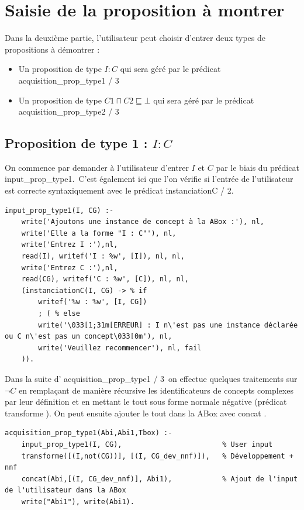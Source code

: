 \documentclass{article}
\begin{document}
\section{Saisie de la proposition à montrer}
Dans la deuxième partie, l'utilisateur peut choisir d'entrer deux types de propositions à démontrer : 
\begin{itemize}
    \item Un proposition de type $ I : C $ qui sera géré par le prédicat \color{blue}acquisition\_prop\_type1 / 3 \color{black}
    \item Un proposition de type $ C1 \sqcap C2 \sqsubseteq \bot  $ qui sera géré par le prédicat \color{blue}acquisition\_prop\_type2 / 3 \color{black}
\end{itemize}

\subsection{Proposition de type 1 : $ I : C $ }
On commence par demander à l'utilisateur d'entrer $ I $ et $ C $ par le biais du prédicat \color{blue}input\_prop\_type1\color{black}.\ C'est également ici que l'on vérifie si l'entrée de l'utilisateur est correcte syntaxiquement avec le prédicat \color{blue}instanciationC / 2\color{black}.
\begin{verbatim}
input_prop_type1(I, CG) :-
    write('Ajoutons une instance de concept à la ABox :'), nl,
    write('Elle a la forme "I : C"'), nl,
    write('Entrez I :'),nl, 
    read(I), writef('I : %w', [I]), nl, nl,
    write('Entrez C :'),nl, 
    read(CG), writef('C : %w', [C]), nl, nl,
    (instanciationC(I, CG) -> % if 
        writef('%w : %w', [I, CG])
        ; ( % else
        write('\033[1;31m[ERREUR] : I n\'est pas une instance déclarée ou C n\'est pas un concept\033[0m'), nl,
        write('Veuillez recommencer'), nl, fail
    )).
\end{verbatim}
Dans la suite d'\color{blue} acquisition\_prop\_type1 / 3\color{black}\ on effectue quelques traitements sur $ \neg C $ en remplaçant de manière récursive les identificateurs de concepts complexes par leur définition et en mettant le tout sous forme normale négative (prédicat \color{blue} transforme \color{black}). On peut ensuite ajouter le tout dans la ABox avec \color{blue} concat \color{black}.
\begin{verbatim}
acquisition_prop_type1(Abi,Abi1,Tbox) :- 
    input_prop_type1(I, CG),                        % User input
    transforme([(I,not(CG))], [(I, CG_dev_nnf)]),   % Développement + nnf
    concat(Abi,[(I, CG_dev_nnf)], Abi1),            % Ajout de l'input de l'utilisateur dans la ABox
    write("Abi1"), write(Abi1). 
\end{verbatim}
\end{document}
